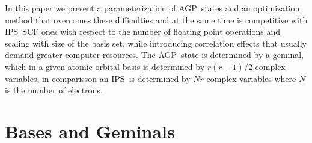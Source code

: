 \documentclass{article}
\begin{document}
In this paper we present a parameterization of AGP\ states and an
optimization method that overcomes these difficulties and at the same time
is competitive with IPS\ SCF ones with respect to the number of floating
point operations and scaling with size of the basis set, while introducing
correlation effects that usually demand greater computer resources. The AGP\
state is determined by a geminal, which in a given atomic orbital basis is
determined by $r\left( r-1\right) /2$ complex variables, in comparisson an
IPS\ is determined by $Nr$ complex variables where $N$ is the number of
electrons.

\section{Bases and Geminals}
\end{document}
